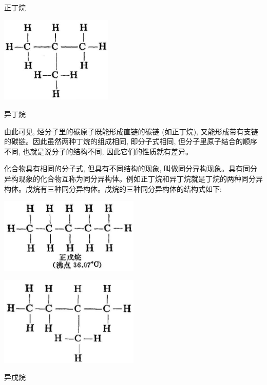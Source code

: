 \documentclass[10pt]{article}
\begin{document}
正丁烷

\begin{center}
\includegraphics[max width=0.4\textwidth]{images/01912d16-be99-77bb-9535-4f3ed8d9946f_62_618707.jpg}
\end{center}

异丁烷

由此可见, 烃分子里的碳原子既能形成直链的碳链 (如正丁烷), 又能形成带有支链的碳链。因此虽然两种丁烷的组成相同, 即分子式相同, 但分子里原子结合的顺序不同, 也就是说分子的结构不同, 因此它们的性质就有差异。

化合物具有相同的分子式, 但具有不同结构的现象, 叫做同分异构现象。具有同分异构现象的化合物互称为同分异构体。例如正丁烷和异丁烷就是丁烷的两种同分异构体。戊烷有三种同分异构体。戊烷的三种同分异构体的结构式如下:

\begin{center}
\includegraphics[max width=0.5\textwidth]{images/01912d16-be99-77bb-9535-4f3ed8d9946f_62_329682.jpg}
\end{center}

\begin{center}
\includegraphics[max width=0.5\textwidth]{images/01912d16-be99-77bb-9535-4f3ed8d9946f_63_540147.jpg}
\end{center}

异戊烷
\end{document}
